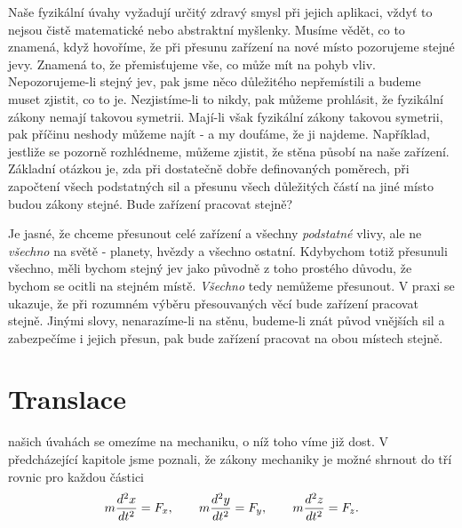 {    Naše fyzikální úvahy vyžadují určitý zdravý smysl při jejich aplikaci, vždyť to nejsou čistě 
    matematické nebo abstraktní myšlenky. Musíme vědět, co to znamená, když hovoříme, že při 
    přesunu zařízení na nové místo pozorujeme stejné jevy. Znamená to, že přemisťujeme vše, co může 
    mít na pohyb vliv. Nepozorujeme-li stejný jev, pak jsme něco důležitého nepřemístili a budeme 
    muset zjistit, co to je. Nezjistíme-li to nikdy, pak můžeme prohlásit, že fyzikální zákony 
    nemají takovou symetrii. Mají-li však fyzikální zákony takovou symetrii, pak příčinu neshody 
    můžeme najít - a my doufáme, že ji najdeme. Například, jestliže se pozorně rozhlédneme, můžeme 
    zjistit, že stěna působí na naše zařízení. Základní otázkou je, zda při dostatečně dobře 
    definovaných poměrech, při započtení všech podstatných sil a přesunu všech důležitých částí na 
    jiné místo budou zákony stejné. Bude zařízení pracovat stejně?
    
    Je jasné, že chceme přesunout celé zařízení a všechny \emph{podstatné} vlivy, ale ne 
    \emph{všechno} na světě - planety, hvězdy a všechno ostatní. Kdybychom totiž přesunuli všechno, 
    měli bychom stejný jev jako původně z toho prostého důvodu, že bychom se ocitli na stejném 
    místě. \emph{Všechno} tedy nemůžeme přesunout. V praxi se ukazuje, že při rozumném výběru 
    přesouvaných věcí bude zařízení pracovat stejně. Jinými slovy, nenarazíme-li na stěnu, 
    budeme-li znát původ vnějších sil a zabezpečíme i jejich přesun, pak bude zařízení pracovat na 
    obou místech stejně.
    
  \section{Translace}
    našich úvahách se omezíme na mechaniku, o níž toho víme již dost. V předcházející kapitole 
    jsme poznali, že zákony mechaniky je možné shrnout do tří rovnic pro každou částici
    \begin{equation}\label{FYZ:eq145}
      m\frac{d^2 x}{d t^2} = F_x, \qquad
      m\frac{d^2 y}{d t^2} = F_y, \qquad
      m\frac{d^2 z}{d t^2} = F_z.
    \end{equation}

}
